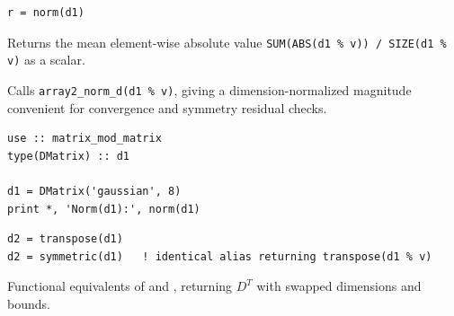 
\lstset{language=[95]Fortran}
\begin{lstlisting}
r = norm(d1)
\end{lstlisting}

Returns the mean element-wise absolute value \texttt{SUM(ABS(d1 \% v)) / SIZE(d1 \% v)} as a  scalar.

Calls \texttt{array2\_norm\_d(d1 \% v)}, giving a dimension-normalized magnitude convenient for convergence and symmetry residual checks.

\begin{description}[leftmargin=2.2cm, style=nextline]
\end{description}

\lstset{language=[95]Fortran}
\begin{lstlisting}
use :: matrix_mod_matrix
type(DMatrix) :: d1

d1 = DMatrix('gaussian', 8)
print *, 'Norm(d1):', norm(d1)
\end{lstlisting}


\lstset{language=[95]Fortran}
\begin{lstlisting}
d2 = transpose(d1)
d2 = symmetric(d1)   ! identical alias returning transpose(d1 % v)
\end{lstlisting}

Functional equivalents of  and , returning $D^T$ with swapped dimensions and bounds.

